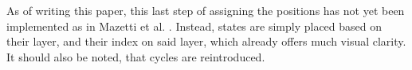 As of writing this paper, this last step of assigning the positions has not yet been implemented as in Mazetti et al. \cite{Mazetti2012}. Instead, states are simply placed based on their layer, and their index on said layer, which already offers much visual clarity. It should also be noted, that cycles are reintroduced.


